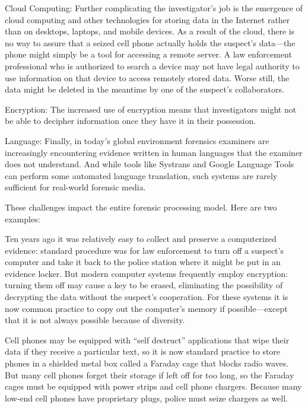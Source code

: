 \begin{compactdesc}
\item[Cloud Computing:] Further complicating the investigator's job is
  the emergence of cloud computing and other technologies for storing
  data in the Internet rather than on desktops, laptops, and mobile
  devices. As a result of the cloud, there is no way to assure that a
  seized cell phone actually holds the suspect's data---the phone
  might simply be a tool for accessing a remote server. A law
  enforcement professional who is authorized to search a device may
  not have legal authority to use information on that device to access
  remotely stored data. Worse still, the data might be deleted in the
  meantime by one of the suspect's collaborators.

\item[Encryption:] The increased use of encryption means that
  investigators might not be able to decipher information once they
  have it in their possession. 

\item[Language:] Finally, in today's global environment forensics
  examiners are increasingly encountering evidence written in human
  languages that the examiner does not understand. And while tools
  like Systrans and Google Language Tools can perform some automated
  language translation, such systems are rarely sufficient for
  real-world forensic media.

\end{compactdesc}

These challenges impact the entire forensic processing model. Here are
two  examples:

\begin{compactitem}
\item Ten years ago it was relatively easy to collect and preserve a
computerized evidence: standard procedure was for law enforcement to
turn off a suspect's computer and take it back to the police station
where it might be put in an evidence locker. But modern computer systems
frequently employ encryption: turning them off may cause a key to be
erased, eliminating the possibility of decrypting the data without the
suspect's cooperation. For these systems it is now common practice to
copy out the computer's memory if possible---except that it is not
always possible because of diversity. 

\item Cell phones may be equipped with ``self destruct'' applications
  that wipe their data if they receive a particular text, so it is now
  standard practice to store phones in a shielded metal box called a
  Faraday cage that blocks radio waves. But many cell phones forget
  their storage if left off for too long, so the Faraday cages must be
  equipped with power strips and cell phone chargers.  Because many
  low-end cell phones have proprietary plugs, police must seize chargers as well.
\end{compactitem}


